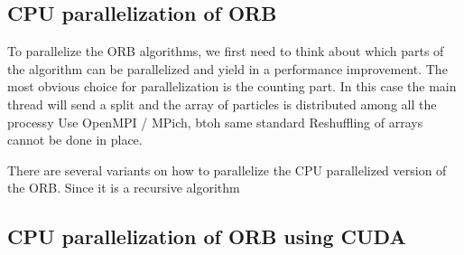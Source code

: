 \documentclass[]{article}
\begin{document}
\subsection{CPU parallelization of ORB}

To parallelize the ORB algorithms, we first need to think about which parts of the algorithm can be parallelized and yield in a performance improvement. The most obvious choice for parallelization is the counting part. In this case the main thread will send a split and the array of particles is distributed among all the processy
Use OpenMPI / MPich, btoh same standard
Reshuffling of arrays cannot be done in place.

There are several variants on how to parallelize the CPU parallelized version of the ORB. Since it is a recursive algorithm 


\subsection{CPU parallelization of ORB using CUDA }


\end{document}
